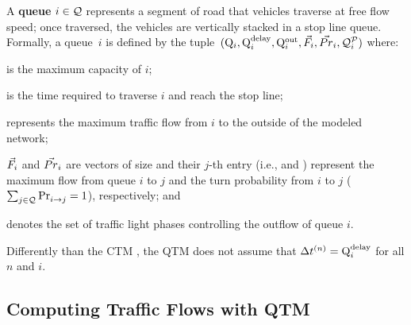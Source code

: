 A \textbf{queue} $i \in \Qset$ represents a segment of road that vehicles
traverse at free flow speed; once traversed, the vehicles are vertically stacked
in a stop line queue.
%
Formally, a queue~$i$ is defined by the tuple~$(\QMAX{i}, \QDELAY{i}, \QOUT{i},
\Fvec_i, \Prvec_i, \QPset{i})$ where:
%
\begin{itemize*}[label={}]
%
\item {} is the maximum capacity of $i$;
%
\item {} is the time required to traverse $i$ and reach the stop line;
%
\item {} represents the maximum traffic flow from $i$ to the outside of
  the modeled network;
%
\item $\Fvec_i$ and $\Prvec_i$ are vectors of size \Qn and their $j$-th entry
  (i.e.,  and ) represent the maximum flow from queue $i$
  to $j$ and the turn probability from $i$ to $j$ ($\sum_{j \in
  \Qset}\FTURN{i}{j} = 1$), respectively; and
%
\item {} denotes the set of traffic light phases controlling the outflow
  of queue $i$.
%
\end{itemize*}


Differently than the CTM \cite{daganzo1994cell,lin2004enhanced}, the QTM does
not assume that $\DT[n] = \QDELAY{i}$ for all $n$ and $i$.
%

%



\subsection{Computing Traffic Flows with QTM}

